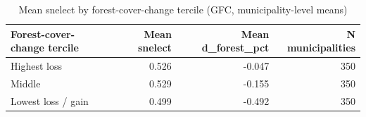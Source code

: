 \begin{table}

\caption{Mean snelect by forest-cover-change tercile (GFC, municipality-level means)}
\centering
\begin{tabular}[t]{lrrr}
\toprule
Forest-cover-change tercile & Mean snelect & Mean d\_forest\_pct & N municipalities\\
\midrule
Highest loss & 0.526 & -0.047 & 350\\
Middle & 0.529 & -0.155 & 350\\
Lowest loss / gain & 0.499 & -0.492 & 350\\
\bottomrule
\end{tabular}
\end{table}

